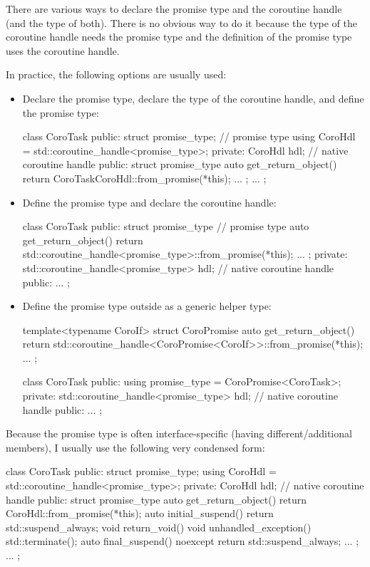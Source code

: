 There are various ways to declare the promise type and the coroutine handle (and the type of both). There is no obvious way to do it because the type of the coroutine handle needs the promise type and the definition of the promise type uses the coroutine handle.

In practice, the following options are usually used:

\begin{itemize}
\item 
Declare the promise type, declare the type of the coroutine handle, and define the promise type:

\begin{cpp}
class CoroTask {
public:
	struct promise_type; // promise type
	using CoroHdl = std::coroutine_handle<promise_type>;
private:
	CoroHdl hdl; // native coroutine handle
public:
	struct promise_type {
		auto get_return_object() {
			return CoroTask{CoroHdl::from_promise(*this)};
		}
		...
	};
	...
};
\end{cpp}

\item 
Define the promise type and declare the coroutine handle:

\begin{cpp}
class CoroTask {
public:
	struct promise_type { // promise type
		auto get_return_object() {
			return std::coroutine_handle<promise_type>::from_promise(*this);
		}
		...
	};
private:
	std::coroutine_handle<promise_type> hdl; // native coroutine handle
	public:
	...
};
\end{cpp}

\item 
Define the promise type outside as a generic helper type:

\begin{cpp}
template<typename CoroIf>
struct CoroPromise {
	auto get_return_object() {
		return std::coroutine_handle<CoroPromise<CoroIf>>::from_promise(*this);
	}
	...
};

class CoroTask {
	public:
	using promise_type = CoroPromise<CoroTask>;
	private:
	std::coroutine_handle<promise_type> hdl; // native coroutine handle
	public:
	...
};
\end{cpp}
\end{itemize}

Because the promise type is often interface-specific (having different/additional members), I usually use the following very condensed form:

\begin{cpp}
class CoroTask {
public:
	struct promise_type;
	using CoroHdl = std::coroutine_handle<promise_type>;
private:
	CoroHdl hdl; // native coroutine handle
public:
	struct promise_type {
		auto get_return_object() { return CoroHdl::from_promise(*this); }
		auto initial_suspend() { return std::suspend_always{}; }
		void return_void() { }
		void unhandled_exception() { std::terminate(); }
		auto final_suspend() noexcept { return std::suspend_always{}; }
		...
	};
	...
};
\end{cpp}

